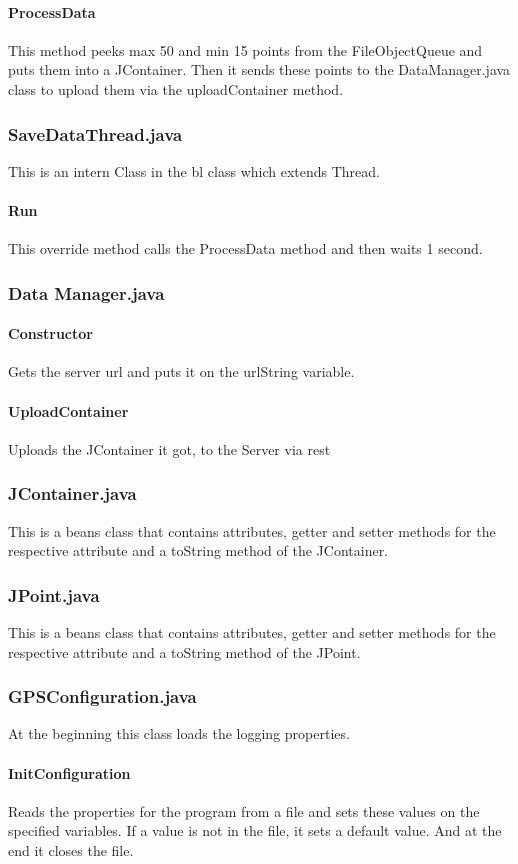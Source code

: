 \paragraph{ProcessData}
This method peeks max 50 and min 15 points from the FileObjectQueue and puts them into a JContainer. Then it sends these points to the DataManager.java class to upload them via the uploadContainer method.
\subsubsection{SaveDataThread.java}
This is an intern Class in the \gls{bl} class which extends Thread.
\paragraph{Run}
This override method calls the ProcessData method and then waits 1 second.
\subsubsection{Data Manager.java}
\paragraph{Constructor}
Gets the server \gls{url} and puts it on the urlString variable.
\paragraph{UploadContainer}
Uploads the JContainer it got, to the Server via \gls{rest} 
\subsubsection{JContainer.java}
This is a beans class that contains attributes, getter and setter methods for the respective attribute and a toString method of the JContainer.
\subsubsection{JPoint.java}
This is a beans class that contains attributes, getter and setter methods for the respective attribute and a toString method of the JPoint.
\subsubsection{GPSConfiguration.java}
At the beginning this class loads the logging properties.
\paragraph{InitConfiguration}
Reads the properties for the program from a file and sets these values on the specified variables. If a value is not in the file, it sets a default value. And at the end it closes the file.
